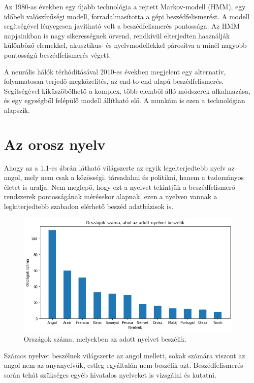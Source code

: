 Az 1980-as években egy újabb technológia a rejtett Markov-modell (HMM), egy időbeli valószínűségi modell, forradalmasította a gépi beszédfelismerést. A modell segítségével lényegesen javítható volt a beszédfelismerés pontossága. Az HMM napjainkban is nagy sikerességnek örvend, rendkívül elterjedten használják különböző elemekkel, akusztikus- és nyelvmodellekkel párosítva a minél nagyobb pontosságú beszédfelismerés végett.

A neurális hálók térhódításával 2010-es években megjelent egy alternatív, folyamatosan terjedő megközelítés, az end-to-end alapú beszédfelismerés. Segítségével kiküszöbölhető a komplex, több elemből álló módszerek alkalmazása, és egy egységből felépülő modell állítható elő. A munkám is ezen a technológian alapszik.

\section{Az orosz nyelv}

Ahogy az a 1.1-es ábrán látható világszerte az egyik legelterjedtebb nyelv az angol, mely nem csak a közösségi, társadalmi és politikai, hanem a tudományos életet is uralja. Nem meglepő, hogy ezt a nyelvet tekintjük a beszédfelismerő rendszerek pontosságának mérésekor alapnak, ezen a nyelven vannak a legkiterjedtebb szabadon elérhető beszéd adatbázisok is.

\begin{figure}[!ht]
\centering
\includegraphics[width=150mm, keepaspectratio]{figures/languagesInCountries.png}
\caption{Országok száma, melyekben az adott nyelvet beszélik. \cite{nyelvekvilaga}}
\end{figure}

Számos nyelvet beszélnek világszerte az angol mellett, sokak számára viszont az angol nem az anyanyelvük, estleg egyáltalán nem beszélik azt. Beszédfelismerés során tehát szükséges egyéb hivatalos nyelveket is vizsgálni és kutatni.

